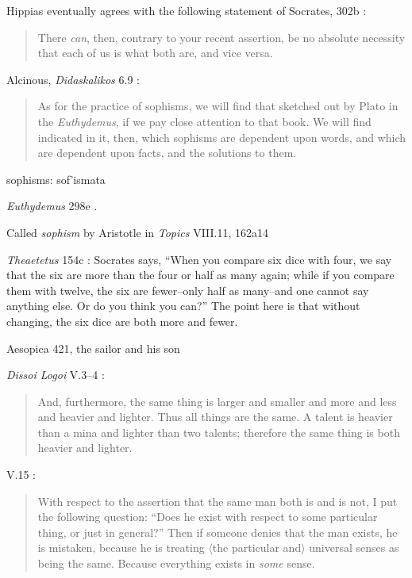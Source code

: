 \documentclass{article}
\newcommand{\textgreek}[1]{\begingroup\fontencoding{LGR}\selectfont#1\endgroup}
\begin{document}
Hippias eventually agrees with the following statement of Socrates, 302b \cite[p.~261]{hippias}:

\begin{quote}
There {\em can}, then, contrary to your recent assertion, be no
absolute necessity that each of us is what both are, and vice versa. 
\end{quote}

Alcinous, {\em Didaskalikos} 6.9 \cite[p.~12]{alcinous}:

\begin{quote}
As for the practice of sophisms, we will find that sketched out
by Plato in the {\em Euthydemus}, if we pay close attention to that book. We
will find indicated in it, then, which sophisms are dependent upon
words, and which are dependent upon facts, and the solutions to
them.
\end{quote}

sophisms: \textgreek{sof'ismata}

{\em Euthydemus} 298e \cite{euthydemus}.

Called {\em sophism} by Aristotle in {\em Topics} VIII.11, 162a14

{\em Theaetetus} 154c \cite[p.~41]{theaetetus}: Socrates says, ``When you compare six dice with four, we say that the six are more than the four
or half as many again; while if you compare them with twelve, the six are fewer--only half as many--and one cannot say anything else. Or do you think you can?''
The point here is that without changing, the six dice are both more and fewer.

Aesopica 421, the sailor and his son

{\em Dissoi Logoi} V.3--4 \cite[p.~163]{dissoilogoi}:

\begin{quote}
And, furthermore, the same thing is larger and smaller and more and less and heavier and lighter. Thus all things are the same.
A talent is heavier than a mina and lighter than two talents; therefore the same thing is both heavier and lighter.
\end{quote}

V.15 \cite[pp.~163--165]{dissoilogoi}:

\begin{quote}
With respect to the assertion that the same man
both is and is not, I put the following question: ``Does he exist with respect to some particular thing, or just in general?''
Then if someone denies that the man exists, he is mistaken, because he is treating {$\langle$}the particular and${\rangle}$ universal senses as being the same.
Because everything exists in {\em some} sense.
\end{quote}
\end{document}
